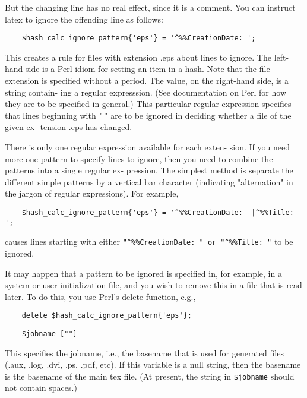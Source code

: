 But the changing line has no real effect, since it is a comment.
You can instruct latex to ignore the offending line as follows:

\begin{verbatim}
	$hash_calc_ignore_pattern{'eps'} = '^%%CreationDate: ';
\end{verbatim}

This creates a rule for files with extension .eps about lines to
ignore.  The left-hand side is a Perl idiom for setting an  item
in  a hash.  Note that the file extension is specified without a
period.  The value, on the right-hand side, is a string contain-
ing  a  regular expresssion.  (See documentation on Perl for how
they are to be specified in general.)  This  particular  regular
expression  specifies that lines beginning with "%
" are to be ignored in deciding whether a file of the given  ex-
tension .eps has changed.

There  is  only one regular expression available for each exten-
sion.  If you need more one pattern to specify lines to  ignore,
then  you need to combine the patterns into a single regular ex-
pression.  The simplest method is separate the different  simple
patterns  by  a vertical bar character (indicating "alternation"
in the jargon of regular expressions).  For example,

\begin{verbatim}
	$hash_calc_ignore_pattern{'eps'} = '^%%CreationDate:  |^%%Title: ';
\end{verbatim}

causes lines starting with either \verb|"^%%CreationDate: " or "^%%Title: "| to be ignored.

It may happen that a pattern to be ignored is specified in,  for
example,  in  a system or user initialization file, and you wish
to remove this in a file that is read later.  To  do  this,  you
use Perl's delete function, e.g.,

\begin{verbatim}
	delete $hash_calc_ignore_pattern{'eps'};
\end{verbatim}

\begin{verbatim}
	$jobname [""]
\end{verbatim}

This  specifies the jobname, i.e., the basename that is used for generated
files (.aux, .log, .dvi, .ps,  .pdf,  etc).   If  this variable  is a null
string, then the basename is the basename of the main tex file.  (At present,
the string in  \verb|$jobname|  should not contain spaces.)

